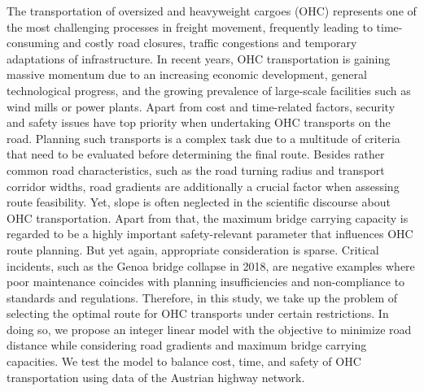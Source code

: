 
The transportation of oversized and heavyweight cargoes (OHC) represents one of the most challenging processes in freight movement, frequently leading to time-consuming and costly road closures, traffic congestions and temporary adaptations of infrastructure. In recent years, OHC transportation is gaining massive momentum due to an increasing economic development, general technological progress, and the growing prevalence of large-scale facilities such as wind mills or power plants. Apart from cost and time-related factors, security and safety issues have top priority when undertaking OHC transports on the road. Planning such transports is a complex task due to a multitude of criteria that need to be evaluated before determining the final route. Besides rather common road characteristics, such as the road turning radius and transport corridor widths, road gradients are additionally  a crucial factor when assessing route feasibility. Yet, slope is often neglected in the scientific discourse about OHC transportation. Apart from that, the maximum bridge carrying capacity is regarded to be a highly important safety-relevant parameter that influences OHC route planning. But yet again, appropriate consideration is sparse. Critical incidents, such as the Genoa bridge collapse in 2018, are negative examples where poor maintenance coincides with planning insufficiencies and non-compliance to standards and regulations. Therefore, in this study, we take up the problem of selecting the optimal route for OHC transports under certain restrictions. In doing so, we propose an integer linear model with the objective to minimize road distance while considering road gradients and maximum bridge carrying capacities. We test the model to balance cost, time, and safety of OHC transportation using data of the Austrian highway network.
